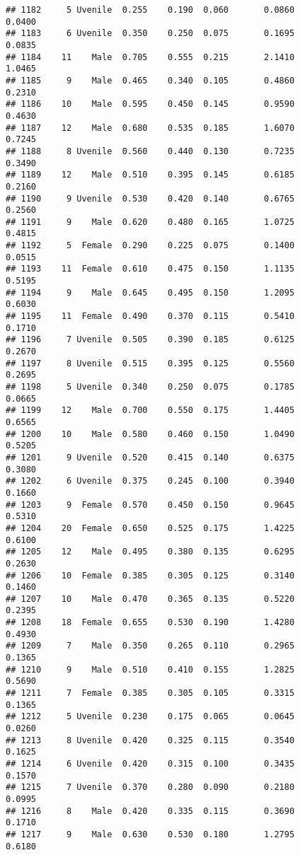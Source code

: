 \documentclass[
]{article}
\begin{document}
\begin{verbatim}
## 1182     5 Uvenile  0.255    0.190  0.060       0.0860         0.0400
## 1183     6 Uvenile  0.350    0.250  0.075       0.1695         0.0835
## 1184    11    Male  0.705    0.555  0.215       2.1410         1.0465
## 1185     9    Male  0.465    0.340  0.105       0.4860         0.2310
## 1186    10    Male  0.595    0.450  0.145       0.9590         0.4630
## 1187    12    Male  0.680    0.535  0.185       1.6070         0.7245
## 1188     8 Uvenile  0.560    0.440  0.130       0.7235         0.3490
## 1189    12    Male  0.510    0.395  0.145       0.6185         0.2160
## 1190     9 Uvenile  0.530    0.420  0.140       0.6765         0.2560
## 1191     9    Male  0.620    0.480  0.165       1.0725         0.4815
## 1192     5  Female  0.290    0.225  0.075       0.1400         0.0515
## 1193    11  Female  0.610    0.475  0.150       1.1135         0.5195
## 1194     9    Male  0.645    0.495  0.150       1.2095         0.6030
## 1195    11  Female  0.490    0.370  0.115       0.5410         0.1710
## 1196     7 Uvenile  0.505    0.390  0.185       0.6125         0.2670
## 1197     8 Uvenile  0.515    0.395  0.125       0.5560         0.2695
## 1198     5 Uvenile  0.340    0.250  0.075       0.1785         0.0665
## 1199    12    Male  0.700    0.550  0.175       1.4405         0.6565
## 1200    10    Male  0.580    0.460  0.150       1.0490         0.5205
## 1201     9 Uvenile  0.520    0.415  0.140       0.6375         0.3080
## 1202     6 Uvenile  0.375    0.245  0.100       0.3940         0.1660
## 1203     9  Female  0.570    0.450  0.150       0.9645         0.5310
## 1204    20  Female  0.650    0.525  0.175       1.4225         0.6100
## 1205    12    Male  0.495    0.380  0.135       0.6295         0.2630
## 1206    10  Female  0.385    0.305  0.125       0.3140         0.1460
## 1207    10    Male  0.470    0.365  0.135       0.5220         0.2395
## 1208    18  Female  0.655    0.530  0.190       1.4280         0.4930
## 1209     7    Male  0.350    0.265  0.110       0.2965         0.1365
## 1210     9    Male  0.510    0.410  0.155       1.2825         0.5690
## 1211     7  Female  0.385    0.305  0.105       0.3315         0.1365
## 1212     5 Uvenile  0.230    0.175  0.065       0.0645         0.0260
## 1213     8 Uvenile  0.420    0.325  0.115       0.3540         0.1625
## 1214     6 Uvenile  0.420    0.315  0.100       0.3435         0.1570
## 1215     7 Uvenile  0.370    0.280  0.090       0.2180         0.0995
## 1216     8    Male  0.420    0.335  0.115       0.3690         0.1710
## 1217     9    Male  0.630    0.530  0.180       1.2795         0.6180

\end{verbatim}
\end{document}
